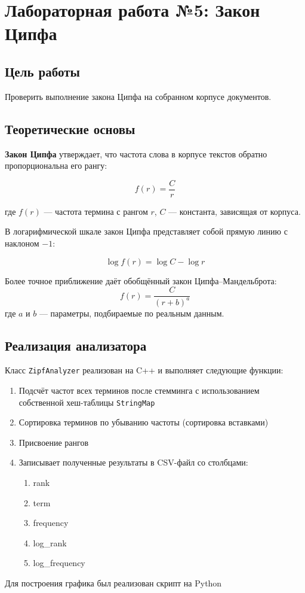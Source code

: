 \documentclass[a4paper,12pt]{article}
\begin{document}
\section{Лабораторная работа №5: Закон Ципфа}

\subsection{Цель работы}
Проверить выполнение закона Ципфа на собранном корпусе документов.

\subsection{Теоретические основы}

\textbf{Закон Ципфа} утверждает, что частота слова в корпусе текстов обратно пропорциональна его рангу:

\[ f(r) = \frac{C}{r} \]

где $f(r)$ --- частота термина с рангом $r$, $C$ --- константа, зависящая от корпуса.

В логарифмической шкале закон Ципфа представляет собой прямую линию с наклоном $-1$:

\[ \log f(r) = \log C - \log r \]

Более точное приближение даёт обобщённый закон Ципфа--Мандельброта:
\[ f(r) = \frac{C}{(r + b)^a} \]
где $a$ и $b$ --- параметры, подбираемые по реальным данным.

\subsection{Реализация анализатора}

Класс \texttt{ZipfAnalyzer} реализован на C++ и выполняет следующие функции:
\begin{enumerate}
    \item Подсчёт частот всех терминов после стемминга с использованием собственной хеш-таблицы \texttt{StringMap}
    \item Сортировка терминов по убыванию частоты (сортировка вставками)
    \item Присвоение рангов
    \item Записывает полученные результаты в CSV-файл со столбцами:
    \begin{enumerate}
        \item rank
        \item term
        \item frequency
        \item log\_rank
        \item log\_frequency
    \end{enumerate}
\end{enumerate}
Для  построения графика был реализован скрипт на Python
\end{document}
